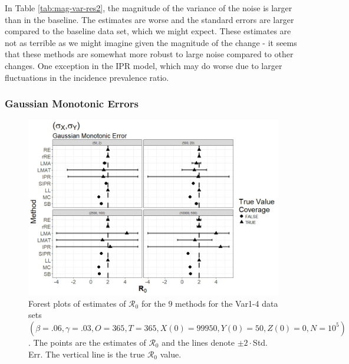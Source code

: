 \documentclass[12pt]{article}
\newcommand{\xxsir}{\ensuremath{9} } %
\newcommand{\rr}{\ensuremath{\mathcal{R}_0}}
\begin{document}
In Table \ref{tab:mag-var-res2}, the magnitude of the variance of the noise is larger than in the baseline. The estimates are worse and the standard errors are larger compared to the baseline data set, which we might expect. These estimates are not as terrible as we might imagine given the magnitude of the change - it seems that these methods are somewhat more robust to large noise compared to other changes. One exception in the IPR model, which may do worse due to larger fluctuations in the incidence prevalence ratio. 

\subsubsection{Gaussian Monotonic Errors}

\begin{figure}[H]
	\begin{center}
		\includegraphics[scale=0.5]{images/var_nm.jpeg}
		\caption{Forest plots of estimates of $\rr$ for the \xxsir methods for the Var1-4 data sets $(\beta=.06, \gamma=.03, O=365, T=365, X(0)=99950, Y(0)=50, Z(0)=0, N=10^5)$.  The points are the estimates of $\rr$ and the lines denote $\pm 2\cdot $Std. Err.  The vertical line is the true $\rr$ value.}
	\end{center}
\end{figure}
\end{document}
